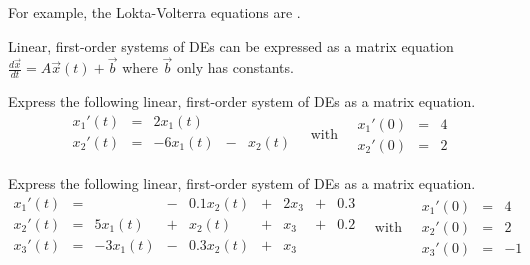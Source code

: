 \documentclass[../main.tex]{subfiles}
\begin{document}
For example, the Lokta-Volterra equations are \underline{\hspace{3in}}.
\clearpage

Linear, first-order systems of DEs can be expressed as a matrix equation \(\frac{d \vec{x}}{dt} = A \vec{x}(t) + \vec{b}\) where \(\vec{b}\) only has constants.

\begin{example}
  Express the following linear, first-order system of DEs as a matrix equation.
  \[
     \begin{array}{rcrcr}
      x_{1}'(t) &=&  2 x_{1}(t) \\
      x_{2}'(t) &=& -6 x_{1}(t) &-& x_{2}(t) \\
     \end{array}
     \quad\text{with}\quad
     \begin{array}{rcr}
      x_{1}'(0) &=& 4 \\
      x_{2}'(0) &=& 2
     \end{array}
  \]

\end{example}

\begin{example}
  Express the following linear, first-order system of DEs as a matrix equation.
  \[
     \begin{array}{rcrcrcrcr}
       x_{1}'(t) &=&              &-& 0.1 x_{2}(t) &+& 2 x_{3} &+& 0.3\\
       x_{2}'(t) &=&   5 x_{1}(t) &+&     x_{2}(t) &+&   x_{3} &+& 0.2 \\
       x_{3}'(t) &=&  -3 x_{1}(t) &-& 0.3 x_{2}(t) &+&   x_{3} \\
     \end{array}
     \quad\text{with}\quad
     \begin{array}{rcr}
      x_{1}'(0) &=& 4 \\
      x_{2}'(0) &=& 2 \\
      x_{3}'(0) &=& -1
     \end{array}
  \]

\end{example}

\end{document}
